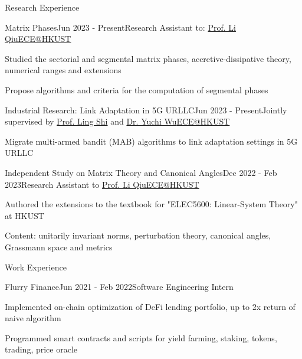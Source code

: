 \documentclass{resume}
\begin{document}
\begin{rSection}{Research Experience}

    \begin{rSubsection}{Matrix Phases}{Jun 2023 - Present}{Research Assistant to: \href{https://eeqiu.people.ust.hk/}{Prof. Li Qiu}}{\href{https://ece.hkust.edu.hk/}{ECE@HKUST}}
        \item Studied the sectorial and segmental matrix phases, accretive-dissipative theory, numerical ranges and extensions
        \item Propose algorithms and criteria for the computation of segmental phases
    \end{rSubsection}

    \begin{rSubsection}{Industrial Research: Link Adaptation in 5G URLLC}{Jun 2023 - Present}{Jointly supervised by \href{https://eesling.home.ece.ust.hk/}{Prof. Ling Shi} and \href{https://ieeexplore.ieee.org/author/37086153473}{Dr. Yuchi Wu}}{\href{https://ece.hkust.edu.hk/}{ECE@HKUST}}
        \item Migrate multi-armed bandit (MAB) algorithms to link adaptation settings in 5G URLLC
    \end{rSubsection}

    \begin{rSubsection}{Independent Study on Matrix Theory and Canonical Angles}{Dec 2022 - Feb 2023}{Research Assistant to \href{https://eeqiu.people.ust.hk/}{Prof. Li Qiu}}{\href{https://ece.hkust.edu.hk/}{ECE@HKUST}}
        \item Authored the extensions to the textbook for "ELEC5600: Linear-System Theory" at HKUST
        \item Content: unitarily invariant norms, perturbation theory, canonical angles, Grassmann space and metrics
    \end{rSubsection}

\end{rSection}

\begin{rSection}{Work Experience}

    \begin{rSubsection}{Flurry Finance}{Jun 2021 - Feb 2022}{Software Engineering Intern}{}
        \item Implemented on-chain optimization of DeFi lending portfolio, up to 2x return of naive algorithm
        \item Programmed smart contracts and scripts for yield farming, staking, tokens, trading, price oracle
    \end{rSubsection}

\end{rSection}
\end{document}
